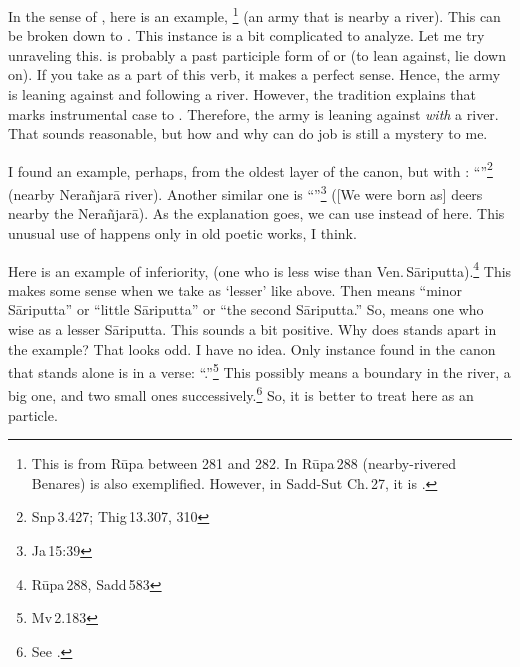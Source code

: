 In the sense of , here is an example, \footnote{This is from R\=upa between 281 and 282. In R\=upa\,288  (nearby-rivered Benares) is also exemplified. However, in Sadd-Sut Ch.\,27, it is  \citep[p.~883]{smith:sadd3}.} (an army that is nearby a river). This can be broken down to . This instance is a bit complicated to analyze. Let me try unraveling this.  is probably a past participle form of  or  (to lean against, lie down on). If you take  as a part of this verb, it makes a perfect sense. Hence, the army is leaning against and following a river. However, the tradition explains that  marks instrumental case to . Therefore, the army is leaning against \emph{with} a river. That sounds reasonable, but how and why  can do  job is still a mystery to me.

I found an example, perhaps, from the oldest layer of the canon, but with : ``''\footnote{Snp\,3.427; Thig\,13.307, 310} (nearby Nera\~njar\=a river). Another similar one is ``''\footnote{Ja\,15:39} ([We were born as] deers nearby the Nera\~njar\=a). As the explanation goes, we can use  instead of  here. This unusual use of  happens only in old poetic works, I think. 

Here is an example of inferiority,  (one who is less wise than Ven.\,S\=ariputta).\footnote{R\=upa\,288, Sadd\,583} This makes some sense when we take  as `lesser' like  above. Then  means ``minor S\=ariputta'' or ``little S\=ariputta'' or ``the second S\=ariputta.'' So,  means one who wise as a lesser S\=ariputta. This sounds a bit positive. Why does  stands apart in the example? That looks odd. I have no idea. Only instance found in the canon that  stands alone is in a verse: ``.''\footnote{Mv\,2.183} This possibly means a boundary in the river, a big one, and two small ones successively.\footnote{See \citealp[p.~1581]{horner:discipline}.} So, it is better to treat  here as an particle.

